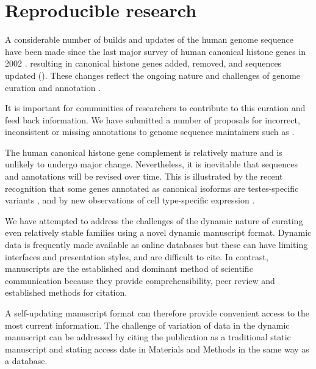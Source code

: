\section{Reproducible research}
\label{sec:reproducible}

  A considerable number of builds and updates of the human genome sequence have been made
  since the last major survey of human canonical histone genes in 2002 \citep{Marzluff02}.
  resulting in
   canonical histone genes added,
   removed,
  and  sequences updated ().
  These changes reflect the ongoing nature and challenges of genome curation and annotation \citep{BorkKoonin1998}.

  It is important for communities of researchers
  to contribute to this curation and feed back information.
  We have submitted a number of proposals
  for incorrect, inconsistent or missing annotations
  to genome sequence maintainers such as .

  The human canonical histone gene complement is relatively mature and is unlikely to undergo major change.
  Nevertheless, it is inevitable that sequences and annotations will be revised over time.
  This is illustrated by the recent recognition that
  some genes annotated as canonical isoforms are testes-specific variants \citep{Talbert2012},
  and by new observations of cell type-specific expression \citep{Molden2015}.

  We have attempted to address the challenges of the dynamic nature of curating
  even relatively stable families using a novel dynamic manuscript format.
  Dynamic data is frequently made available as online databases
  but these can have limiting interfaces and presentation styles, and are difficult to cite.
  In contrast, manuscripts are the established and dominant method of scientific communication
  because they provide comprehensibility, peer review and established methods for citation.

  A self-updating manuscript format can therefore provide
  convenient access to the most current information.
  The challenge of variation of data in the dynamic manuscript can be addressed
  by citing the publication as a traditional static manuscript
  and stating access date in Materials and Methods in the same way as a database.

